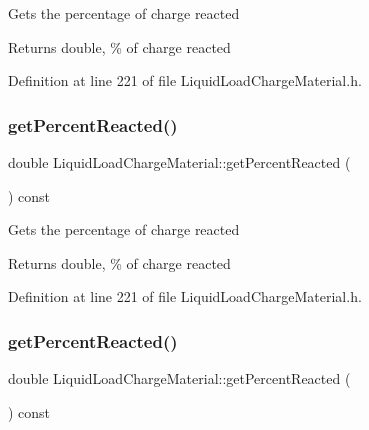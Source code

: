 Gets the percentage of charge reacted \begin{DoxyReturn}{Returns}
double, \% of charge reacted 
\end{DoxyReturn}


Definition at line 221 of file Liquid\+Load\+Charge\+Material.\+h.

\mbox{\label{class_liquid_load_charge_material_acfedb26800cbead9bf11c57e1356dd57}} 
\subsubsection{\texorpdfstring{get\+Percent\+Reacted()}{getPercentReacted()}\hspace{0.1cm}{\footnotesize\ttfamily [2/3]}}
{\footnotesize\ttfamily double Liquid\+Load\+Charge\+Material\+::get\+Percent\+Reacted (\begin{DoxyParamCaption}{ }\end{DoxyParamCaption}) const\hspace{0.3cm}{\ttfamily [inline]}}

Gets the percentage of charge reacted \begin{DoxyReturn}{Returns}
double, \% of charge reacted 
\end{DoxyReturn}


Definition at line 221 of file Liquid\+Load\+Charge\+Material.\+h.

\mbox{\label{class_liquid_load_charge_material_acfedb26800cbead9bf11c57e1356dd57}} 
\subsubsection{\texorpdfstring{get\+Percent\+Reacted()}{getPercentReacted()}\hspace{0.1cm}{\footnotesize\ttfamily [3/3]}}
{\footnotesize\ttfamily double Liquid\+Load\+Charge\+Material\+::get\+Percent\+Reacted (\begin{DoxyParamCaption}{ }\end{DoxyParamCaption}) const\hspace{0.3cm}{\ttfamily [inline]}}

